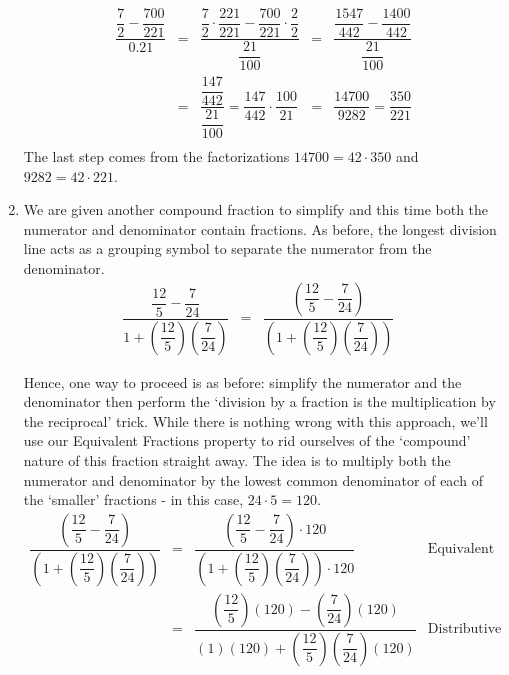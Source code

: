 \begin{ex}
\begin{enumerate}
\[\begin{array}{rclcl}
\dfrac{\dfrac{7}{2}-\dfrac{700}{221}}{0.21} & = & \dfrac{\dfrac{7}{2}\cdot\dfrac{221}{221} - \dfrac{700}{221}\cdot\dfrac{2}{2}}{\dfrac{21}{100}} & = & \dfrac{\dfrac{1547}{442} -\dfrac{1400}{442}}{\dfrac{21}{100}} \\[10pt] 
		                                        & = & \dfrac{\dfrac{147}{442}}{\dfrac{21}{100}} = \dfrac{147}{442} \cdot \dfrac{100}{21} & = & \dfrac{14700}{9282} = \dfrac{350}{221} \\ \end{array}\] The last step comes from the factorizations $14700 = 42 \cdot 350$ and $9282 = 42 \cdot 221$.


\item We are given another compound fraction to simplify and this time both the numerator and denominator contain fractions.  As before, the longest division line acts as a grouping symbol to separate the numerator from the denominator.\[ \begin{array}{rclr}

\dfrac{\dfrac{12}{5} - \dfrac{7}{24}}{1 + \left(\dfrac{12}{5}\right) \left(\dfrac{7}{24}\right)} & = & \dfrac{\left(\dfrac{12}{5} - \dfrac{7}{24}\right)}{\left(1 + \left(\dfrac{12}{5}\right) \left(\dfrac{7}{24}\right)\right)} & \end{array} \] 

Hence, one way to proceed is as before: simplify the numerator and the denominator then perform the `division by a fraction is the multiplication by the reciprocal' trick.  While there is nothing wrong with this approach, we'll use our Equivalent Fractions property to rid ourselves of the `compound' nature of this fraction straight away.  The idea is to multiply both the numerator and denominator by the lowest common denominator of each of the `smaller' fractions - in this case, $24 \cdot 5 = 120$.\[ \begin{array}{rclr}

 \dfrac{\left(\dfrac{12}{5} - \dfrac{7}{24}\right)}{\left(1 + \left(\dfrac{12}{5}\right) \left(\dfrac{7}{24}\right)\right)} & = &\dfrac{\left(\dfrac{12}{5} - \dfrac{7}{24}\right) \cdot 120}{\left(1 + \left(\dfrac{12}{5}\right) \left(\dfrac{7}{24}\right)\right) \cdot 120} & \text{Equivalent Fractions}\\ [30pt]

& = & \dfrac{\left(\dfrac{12}{5}\right) (120) - \left(\dfrac{7}{24}\right) (120)}{(1)(120) + \left(\dfrac{12}{5}\right) \left(\dfrac{7}{24}\right)(120)} & \text{Distributive Property} \\[30pt]


\end{array}\]
\end{enumerate}
\end{ex}
